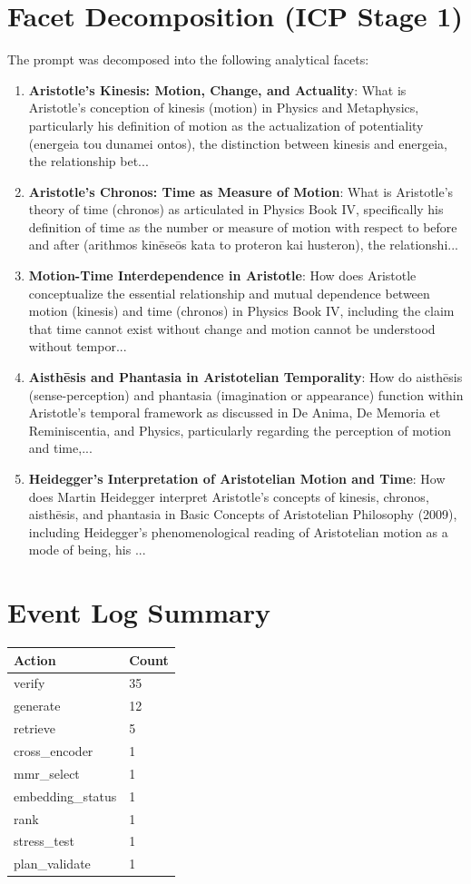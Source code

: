 \documentclass[12pt,a4paper]{article}
\begin{document}
\section{Facet Decomposition (ICP Stage 1)}

The prompt was decomposed into the following analytical facets:

\begin{enumerate}
\item \textbf{Aristotle's Kinesis: Motion, Change, and Actuality}: What is Aristotle's conception of kinesis (motion) in Physics and Metaphysics, particularly his definition of motion as the actualization of potentiality (energeia tou dunamei ontos), the distinction between kinesis and energeia, the relationship bet...
\item \textbf{Aristotle's Chronos: Time as Measure of Motion}: What is Aristotle's theory of time (chronos) as articulated in Physics Book IV, specifically his definition of time as the number or measure of motion with respect to before and after (arithmos kinēseōs kata to proteron kai husteron), the relationshi...
\item \textbf{Motion-Time Interdependence in Aristotle}: How does Aristotle conceptualize the essential relationship and mutual dependence between motion (kinesis) and time (chronos) in Physics Book IV, including the claim that time cannot exist without change and motion cannot be understood without tempor...
\item \textbf{Aisthēsis and Phantasia in Aristotelian Temporality}: How do aisthēsis (sense-perception) and phantasia (imagination or appearance) function within Aristotle's temporal framework as discussed in De Anima, De Memoria et Reminiscentia, and Physics, particularly regarding the perception of motion and time,...
\item \textbf{Heidegger's Interpretation of Aristotelian Motion and Time}: How does Martin Heidegger interpret Aristotle's concepts of kinesis, chronos, aisthēsis, and phantasia in Basic Concepts of Aristotelian Philosophy (2009), including Heidegger's phenomenological reading of Aristotelian motion as a mode of being, his ...
\end{enumerate}


\section{Event Log Summary}

\begin{longtable}{p{4cm}p{2cm}}
\toprule
\textbf{Action} & \textbf{Count} \\
\midrule
verify & 35 \\
generate & 12 \\
retrieve & 5 \\
cross_encoder & 1 \\
mmr_select & 1 \\
embedding_status & 1 \\
rank & 1 \\
stress_test & 1 \\
plan_validate & 1 \\
\bottomrule
\end{longtable}
\end{document}
